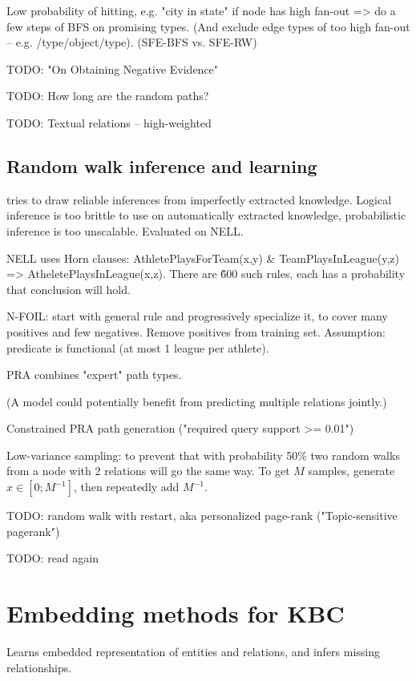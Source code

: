 Low probability of hitting, e.g. "city in state" if node has high fan-out =>
do a few steps of BFS on promising types. (And exclude edge types of too high
fan-out -- e.g. /type/object/type). (SFE-BFS vs. SFE-RW)

TODO: "On Obtaining Negative Evidence"

TODO: How long are the random paths?

TODO: Textual relations -- high-weighted

\subsection{Random walk inference and learning}

\cite{random-walk-inference} tries to draw reliable inferences from imperfectly
extracted knowledge. Logical inference is too brittle to use on automatically
extracted knowledge, probabilistic inference is too unscalable.
Evaluated on NELL.

NELL uses Horn clauses: AthletePlaysForTeam(x,y) \& TeamPlaysInLeague(y,z) =>
AtheletePlaysInLeague(x,z). There are \~600 such rules, each has a probability
that conclusion will hold.

N-FOIL: start with general rule and progressively specialize it, to cover many
positives and few negatives. Remove positives from training set.
Assumption: predicate is functional (at most 1 league per athlete).

PRA combines "expert" path types.

(A model could potentially benefit from predicting multiple relations jointly.)

Constrained PRA path generation ("required query support >=
0.01")\cite{random-walk-inference}

Low-variance sampling: to prevent that with probability 50\% two random walks
from a node with 2 relations will go the same way. To get $M$ samples, generate
$x\in[0;M^{-1}]$, then repeatedly add $M^{-1}$.

TODO: random walk with restart, aka personalized page-rank ("Topic-sensitive
pagerank")

TODO: read again

\section{Embedding methods for KBC}

Learns embedded representation of entities and relations, and infers missing
relationships.

